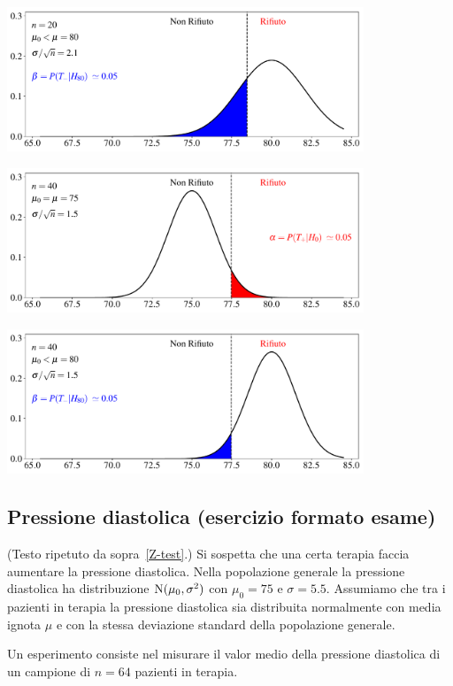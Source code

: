 \documentclass[11pt,openany]{book}
\begin{document}
\hfil\includegraphics[width=0.8\textwidth]{figure/Z-test_02.pdf}

\hfil\includegraphics[width=0.8\textwidth]{figure/Z-test_03.pdf}

\hfil\includegraphics[width=0.8\textwidth]{figure/Z-test_04.pdf}



\clearpage\subsection{Pressione diastolica (esercizio formato esame)}
\label{Pressione diastolica esercizio 1}

(Testo ripetuto da sopra~\ref{Z-test}.) 
Si sospetta che una certa terapia faccia aumentare la pressione diastolica. Nella popolazione generale la pressione diastolica ha distribuzione ${\rm N}(\mu_0,\sigma^2)$ con $\mu_0=75$ e $\sigma=5.5$. Assumiamo che tra i pazienti in terapia la pressione diastolica sia distribuita normalmente con media ignota $\mu$ e con la stessa deviazione standard della popolazione generale. 

Un esperimento consiste nel misurare il valor medio della pressione diastolica di un campione di $n=64$ pazienti in terapia.
\end{document}
